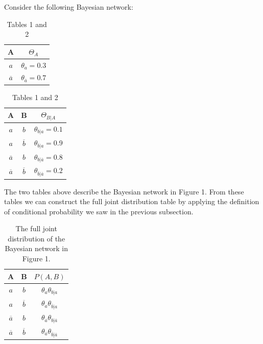 \documentclass[a4paper,10pt]{article}
\theoremstyle{plain}
\begin{document}
Consider the following Bayesian network:

\begin{figure}[h]
\end{figure}

\begin{table}[h]
  \begin{center}
    \captionsetup{justification=centering}
    \begin{tabular}{c | c}
      A & $\Theta_A$ \\
      \hline
      $a$ & $\theta_a = 0.3$ \\
      $\overline{a}$ & $\theta_{\overline{a}} = 0.7$ \\
    \end{tabular}
    \quad
    \quad
    \begin{tabular}{c c | c}
      A & B & $\Theta_{B|A}$ \\
      \hline
      $a$ & $b$ & $\theta_{b|a}=0.1$ \\
      $a$ & $\overline{b}$ & $\theta_{\overline{b}|a}=0.9$ \\
      $\overline{a}$ & $b$ & $\theta_{b|\overline{a}}=0.8$ \\
      $\overline{a}$ & $\overline{b}$ & $\theta_{\overline{b}|\overline{a}}=0.2$ \\
    \end{tabular}
    \caption*{Tables 1 and 2}
  \end{center}
\end{table}
\setcounter{table}{2}

The two tables above describe the Bayesian network in Figure 1. From these tables we can construct
the full joint distribution table by applying the definition of conditional probability we saw in
the previous subsection.

\begin{table}[h]
  \begin{center}
    \captionsetup{justification=centering}
    \begin{tabular}{c c | c}
      A & B & $P(A,B)$ \\
      \hline
      $a$ & $b$ & $\theta_a\theta_{b|a}$ \\
      $a$ & $\overline{b}$ & $\theta_a\theta_{\overline{b}|a}$ \\
      $\overline{a}$ & $b$ & $\theta_{\overline{a}}\theta_{b|\overline{a}}$ \\
      $\overline{a}$ & $\overline{b}$ & $\theta_{\overline{a}}\theta_{\overline{b}|\overline{a}}$\\
    \end{tabular}
    \caption{The full joint distribution of the Bayesian network in Figure 1.}
  \end{center}
\end{table}
\end{document}

